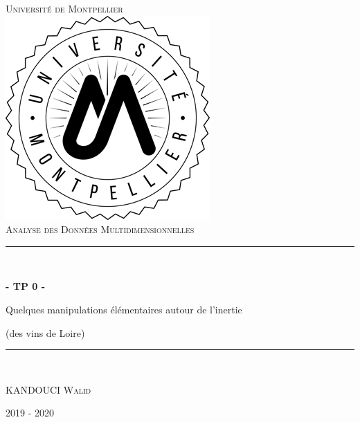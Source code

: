 \documentclass[paper=a4,pagesize=auto,11pt,twoside=true,parskip=half,abstract=on,bibliography=totoc]{report}
\theoremstyle{plain}
\theoremstyle{definition}
\theoremstyle{remark}
\newcommand{\HRule}{\rule{\linewidth}{0.5mm}}
\begin{document}
\begin{titlepage}
  \begin{sffamily}
  \begin{center}
    \textsc{\LARGE Université de Montpellier}\\[2cm]
    \includegraphics[scale=2]{logo-um.png}~\\[1.5cm]
    \textsc{\LARGE Analyse des Données Multidimensionnelles}\\[1.5cm]

    \HRule \\[0.3cm]
    { \huge\bfseries - TP 0 -
    
    Quelques manipulations élémentaires autour de l'inertie 
    
    (des vins de Loire) \\[0.4cm] }
    \HRule \\[2cm]
    \begin{minipage}{0.4\textwidth}
      \begin{center} \large
         \textsc{KANDOUCI Walid}\\
      \end{center}
    \end{minipage}


    \vfill

    {\large 2019 - 2020}

  \end{center}
  \end{sffamily}
\end{titlepage}

\tableofcontents
\listoffigures

\end{document}
